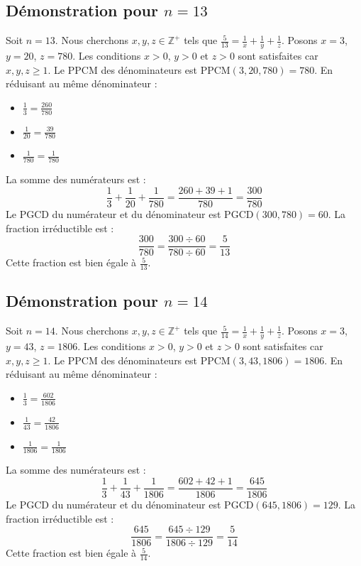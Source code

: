 \documentclass[11pt,a4paper]{article}
\begin{document}
\subsection{Démonstration pour $n = 13$}
Soit $n = 13$. Nous cherchons $x, y, z \in \mathbb{Z}^{+}$ tels que $\frac{5}{13} = \frac{1}{x} + \frac{1}{y} + \frac{1}{z}$.
Posons $x = 3$, $y = 20$, $z = 780$.
Les conditions $x > 0$, $y > 0$ et $z > 0$ sont satisfaites car $x, y, z \geq 1$.
Le PPCM des dénominateurs est $\text{PPCM}(3, 20, 780) = 780$.
En réduisant au même dénominateur :
\begin{itemize}
    \item $\frac{1}{3} = \frac{260}{780}$
    \item $\frac{1}{20} = \frac{39}{780}$
    \item $\frac{1}{780} = \frac{1}{780}$
\end{itemize}
La somme des numérateurs est :
$$ \frac{1}{3} + \frac{1}{20} + \frac{1}{780} = \frac{260 + 39 + 1}{780} = \frac{300}{780} $$
Le PGCD du numérateur et du dénominateur est $\text{PGCD}(300, 780) = 60$.
La fraction irréductible est :
$$ \frac{300}{780} = \frac{300 \div 60}{780 \div 60} = \frac{5}{13} $$
Cette fraction est bien égale à $\frac{5}{13}$.

\subsection{Démonstration pour $n = 14$}
Soit $n = 14$. Nous cherchons $x, y, z \in \mathbb{Z}^{+}$ tels que $\frac{5}{14} = \frac{1}{x} + \frac{1}{y} + \frac{1}{z}$.
Posons $x = 3$, $y = 43$, $z = 1806$.
Les conditions $x > 0$, $y > 0$ et $z > 0$ sont satisfaites car $x, y, z \geq 1$.
Le PPCM des dénominateurs est $\text{PPCM}(3, 43, 1806) = 1806$.
En réduisant au même dénominateur :
\begin{itemize}
    \item $\frac{1}{3} = \frac{602}{1806}$
    \item $\frac{1}{43} = \frac{42}{1806}$
    \item $\frac{1}{1806} = \frac{1}{1806}$
\end{itemize}
La somme des numérateurs est :
$$ \frac{1}{3} + \frac{1}{43} + \frac{1}{1806} = \frac{602 + 42 + 1}{1806} = \frac{645}{1806} $$
Le PGCD du numérateur et du dénominateur est $\text{PGCD}(645, 1806) = 129$.
La fraction irréductible est :
$$ \frac{645}{1806} = \frac{645 \div 129}{1806 \div 129} = \frac{5}{14} $$
Cette fraction est bien égale à $\frac{5}{14}$.
\end{document}
